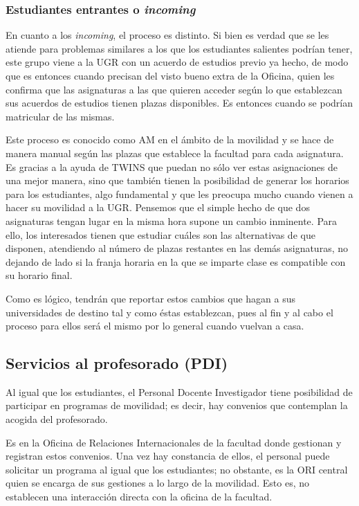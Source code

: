 \subsubsection{Estudiantes entrantes o \textit{incoming}}

En cuanto a los \textit{incoming}, el proceso es distinto. Si bien es verdad que se les atiende para problemas similares a los que los estudiantes salientes podrían tener, este grupo viene a la UGR con un acuerdo de estudios previo ya hecho, de modo que es entonces cuando precisan del visto bueno extra de la Oficina, quien les confirma que las asignaturas a las que quieren acceder según lo que establezcan sus acuerdos de estudios tienen plazas disponibles. Es entonces cuando se podrían matricular de las mismas.

Este proceso es conocido como \gls{AM} en el ámbito de la movilidad y se hace de manera manual según las plazas que establece la facultad para cada asignatura. Es gracias a la ayuda de TWINS que puedan no sólo ver estas asignaciones de una mejor manera, sino que también tienen la posibilidad de generar los horarios para los estudiantes, algo fundamental y que les preocupa mucho cuando vienen a hacer su movilidad a la UGR. Pensemos que el simple hecho de que dos asignaturas tengan lugar en la misma hora supone un cambio inminente. Para ello, los interesados tienen que estudiar cuáles son las alternativas de que disponen, atendiendo al número de plazas restantes en las demás asignaturas, no dejando de lado si la franja horaria en la que se imparte clase es compatible con su horario final.

Como es lógico, tendrán que reportar estos cambios que hagan a sus universidades de destino tal y como éstas establezcan, pues al fin y al cabo el proceso para ellos será el mismo por lo general cuando vuelvan a casa.


\subsection{Servicios al profesorado (PDI)}

Al igual que los estudiantes, el Personal Docente Investigador tiene posibilidad de participar en programas de movilidad; es decir, hay convenios que contemplan la acogida del profesorado.

Es en la Oficina de Relaciones Internacionales de la facultad donde gestionan y registran estos convenios. Una vez hay constancia de ellos, el personal puede solicitar un programa al igual que los estudiantes; no obstante, es la ORI central quien se encarga de sus gestiones a lo largo de la movilidad. Esto es, no establecen una interacción directa con la oficina de la facultad.

